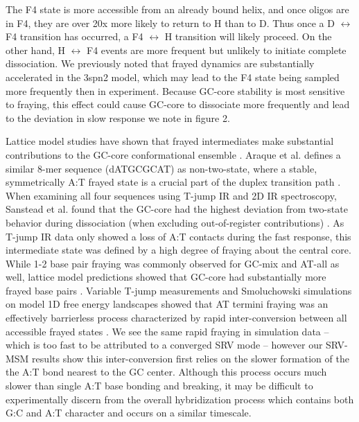 \documentclass[journal=jpcbfk,manuscript=article]{achemso}
\begin{document}
The F4 state is more accessible from an already bound helix, and once oligos are in F4, they are over 20x more likely to return to H than to D. Thus once a D $\leftrightarrow$ F4 transition has occurred, a F4 $\leftrightarrow$ H transition will likely proceed. On the other hand, H $\leftrightarrow$ F4 events are more frequent but unlikely to initiate complete dissociation. We previously noted that frayed dynamics are substantially accelerated in the 3spn2 model, which may lead to the F4 state being sampled more frequently then in experiment. Because GC-core stability is most sensitive to fraying, this effect could cause GC-core to dissociate more frequently and lead to the deviation in slow response we note in figure 2.

Lattice model studies have shown that frayed intermediates make substantial contributions to the GC-core conformational ensemble \citep{Araque2016LatticeCooperativity, Phys2019,Sanstead2020OxidizedDNA}. Araque et al. defines a similar 8-mer sequence (dATGCGCAT) as non-two-state, where a stable, symmetrically A:T frayed state is a crucial part of the duplex transition path \citep{Araque2016LatticeCooperativity}. When examining all four sequences using T-jump IR and 2D IR spectroscopy, Sanstead et al. found that the GC-core had the highest deviation from two-state behavior during dissociation (when excluding out-of-register contributions) \citep{Sanstead2016}. As T-jump IR data only showed a loss of A:T contacts during the fast response, this intermediate state was defined by a high degree of fraying about the central core. While 1-2 base pair fraying was commonly observed for GC-mix and AT-all as well, lattice model predictions showed that GC-core had substantially more frayed base pairs \citep{Phys2019}. Variable T-jump measurements and Smoluchowski simulations on model 1D free energy landscapes showed that AT termini fraying was an effectively barrierless process characterized by rapid inter-conversion between all accessible frayed states \citep{Sanstead2018DirectDehybridization}. We see the same rapid fraying in simulation data -- which is too fast to be attributed to a converged SRV mode -- however our SRV-MSM results show this inter-conversion first relies on the slower formation of the the A:T bond nearest to the GC center.  Although this process occurs much slower than single A:T base bonding and breaking, it may be difficult to experimentally discern from the overall hybridization process which contains both G:C and A:T character and occurs on a similar timescale.
\end{document}

